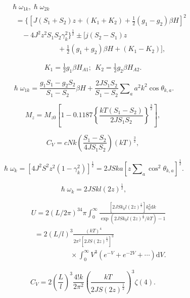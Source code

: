 \documentclass{article}
\begin{document}
\begin{eqnarray} \label{eq:117}
&&\hslash\omega_{1k},\hslash\omega_{2k}\nonumber\\
&&~~~=\{[J(S_1+S_2)z+(K_1+K_2)+\tfrac{1}{2}(g_1-g_2)\beta H]^2\nonumber\\
&&~~~~~~~-4J^2z^2S_1S_2\gamma_k^2\}^\frac{1}{2}\pm[j(S_2-S_1)z\nonumber\\
&&~~~~~~~~~~~~~~~~~~~~~~~~~~~~~~+\tfrac{1}{2}(g_1+g_2)\beta H+(K_1-K_2)],
\end{eqnarray}

\begin{equation} \label{eq:118}
K_1=\tfrac{1}{2}g_1\beta H_{A1};~~K_2=\tfrac{1}{2}g_2\beta H_{A2}.
\end{equation}

\begin{equation} \label{eq:119}
\hslash\omega_{1k}=\frac{g_1S_1-g_2S_2}{S_1-S_2}\beta H+\frac{2JS_1S_2}{S_1-S_2}\sum\nolimits_aa^2k^2\cos\theta_{k,a}.
\end{equation}

\begin{equation} \label{eq:120}
M_z=M_{z0}\left[1-0.1187\left\{\frac{kT(S_1-S_2)}{2JS_1S_2}\right\}^\frac{3}{2}\right],
\end{equation} 

\begin{equation} \label{eq:121}
C_V=cNk\left(\frac{S_1-S_2}{4JS_1S_2}\right)(kT)^\frac{3}{2},
\end{equation}

\begin{equation} \label{eq:122}
\hslash\omega_k=[4J^2S^2z^2(1-\gamma_k^2)]^\frac{1}{2}=2JSka[z\sum\nolimits_a\cos^2\theta_{k,a}]^\frac{1}{2}.
\end{equation}

\begin{equation} \label{eq:123}
\hslash\omega_k=2JSkl(2z)^\frac{1}{2},
\end{equation}

\begin{eqnarray} \label{eq:124}
&&U=2(L/2\pi)^34\pi\int_0^\infty\frac{[2JSk_0l(2z)^\frac{1}{2}]k_0^2\mathrm{d}k}{\exp(2JSk_0l(2z)^\frac{1}{2}/kT)-1}\nonumber\\
&&~~=2(L/l)^3\frac{(kT)^4}{2\pi^2[2JS(2z)^\frac{1}{2}]^3}\\
&&~~~~~~~~~~~~~~~~~~~~~~~~~\times\int_0^\infty V^3(e^{-V}+e^{-2V}+\cdots)\mathrm{d}V.\nonumber
\end{eqnarray}

\begin{equation} \label{eq:125}
C_V=2\left(\frac{L}{l}\right)^3\frac{4!k}{2\pi^2}\left(\frac{kT}{2JS(2z)^\frac{1}{2}}\right)^3\zeta(4).
\end{equation}
\end{document}
